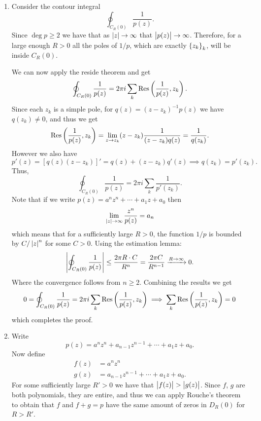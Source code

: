 \documentclass[11pt,a4paper]{article}
\begin{document}
\begin{solution} \phantom{}
\begin{enumerate}
  \item[(1)] Consider the contour integral
    \[
      \oint_{C_R(0)} \frac{1}{p(z)}.
    \]
    Since $\deg p \geq 2$ we have that as $\left\lvert z\right\rvert \to \infty$ that
    $\left\lvert p(z)\right\rvert \to \infty$.
    Therefore, for a large enough $R > 0$ all the poles of $1/p$,
    which are exactly $\left\{z_k\right\}_k$, will be inside $C_R(0)$.

    We can now apply the reside theorem and get
    \[
      \oint_{C_R(0)} \frac{1}{p(z)} =
      2 \pi i \sum_{k} \Res\del{\frac{1}{p(z)}, z_k}.
    \]
    Since each $z_k$ is a simple pole, for $q(z) = (z - z_k)^{-1} p(z)$
    we have $q(z_k) \neq 0$, and thus we get
    \[
      \Res\del{\frac{1}{p(z)}, z_k} =
      \lim_{z \to z_k} (z - z_k) \frac{1}{(z - z_k) q(z)} =
      \frac{1}{q(z_k)}.
    \]
    However we also have
    \[
      p'(z) =
      \left[q(z) (z - z_k)\right]' =
      q(z) + (z - z_k) q'(z) \implies
      q(z_k) = p'(z_k).
    \]
    Thus,
    \[
      \oint_{C_R(0)} \frac{1}{p(z)} =
      2 \pi i \sum_{k} \frac{1}{p'(z_k)}.
    \]
    Note that if we write $p(z) = a^n z^n + \cdots + a_1 z + a_0$ then
    \[
      \lim_{\left\lvert z\right\rvert \to \infty} \frac{z^{n}}{p(z)} = a_n
    \]
    which means that for a sufficiently large $R > 0$, the
    function $1 / p$ is bounded by $C / \left\lvert z\right\rvert^n$ for some $C > 0$.
    Using the estimation lemma:
    \[
      \left\lvert\oint_{C_R(0)} \frac{1}{p(z)}\right\rvert \le
      \frac{2 \pi R \cdot C}{R^{n}} =
      \frac{2 \pi C}{R^{n-1}} \xrightarrow{R \to \infty} 0.
    \]
    Where the convergence follows from $n \geq 2$.
    Combining the results we get
    \[
      0 =
      \oint_{C_R(0)} \frac{1}{p(z)} =
      2 \pi i \sum_{k} \Res\del{\frac{1}{p(z)}, z_k} \implies
      \sum_{k} \Res\del{\frac{1}{p(z)}, z_k} = 0
    \]
    which completes the proof.
  \item[(2)] Write
    \[
      p(z) = a^n z^n + a_{n-1} z^{n-1} + \cdots + a_1 z + a_0.
    \]
    Now define
    \begin{align*}
      f(z) &= a^n z^n \\
      g(z) &= a_{n-1} z^{n-1} + \cdots + a_1 z + a_0.
    \end{align*}
    For some sufficiently large $R' > 0$ we have that $\left\lvert f(z)\right\rvert > \left\lvert g(z)\right\rvert$.
    Since $f$, $g$ are both polynomials, they are entire, and thus we can
    apply Rouche's theorem to obtain that $f$ and $f + g = p$ have the
    same amount of zeros in $D_{R}(0)$ for $R > R'$.


\end{enumerate}
\end{solution}
\end{document}
